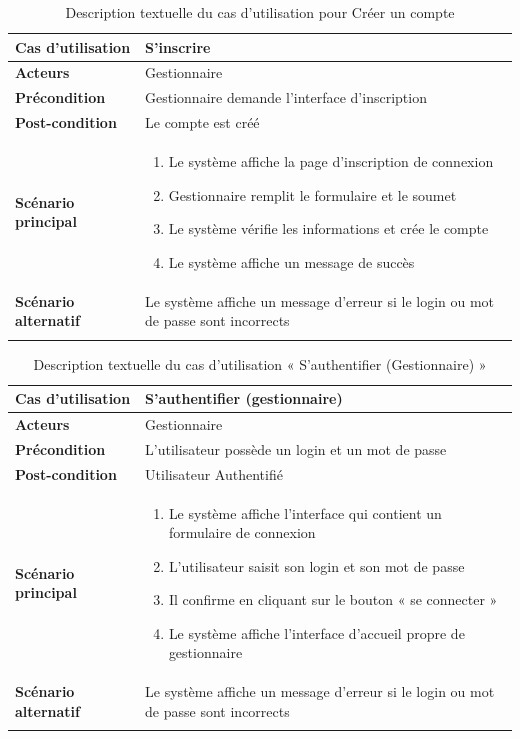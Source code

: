 \begin{longtable}{|>{\bfseries}p{4cm}|p{10cm}|}
\hline
Cas d'utilisation & S'inscrire \\
\hline
Acteurs & Gestionnaire \\
\hline
Précondition & Gestionnaire demande l'interface d'inscription \\
\hline
Post-condition & Le compte est créé \\
\hline
Scénario principal & 
\begin{enumerate}
  \item Le système affiche la page d'inscription de connexion
  \item Gestionnaire remplit le formulaire et le soumet
  \item Le système vérifie les informations et crée le compte
  \item Le système affiche un message de succès
\end{enumerate} \\
\hline
Scénario alternatif & Le système affiche un message d'erreur si le login ou mot de passe sont incorrects \\
\hline
\caption{Description textuelle du cas d'utilisation pour Créer un compte}
\end{longtable}

\begin{longtable}{|>{\bfseries}p{4cm}|p{10cm}|}
\hline
Cas d'utilisation & S'authentifier (gestionnaire) \\
\hline
Acteurs & Gestionnaire \\
\hline
Précondition & L'utilisateur possède un login et un mot de passe \\
\hline
Post-condition & Utilisateur Authentifié \\
\hline
Scénario principal & 
\begin{enumerate}
  \item Le système affiche l'interface qui contient un formulaire de connexion
  \item L'utilisateur saisit son login et son mot de passe
  \item Il confirme en cliquant sur le bouton « se connecter »
  \item Le système affiche l'interface d'accueil propre de gestionnaire
\end{enumerate} \\
\hline
Scénario alternatif & Le système affiche un message d'erreur si le login ou mot de passe sont incorrects \\
\hline
\caption{Description textuelle du cas d'utilisation « S'authentifier (Gestionnaire) »}
\end{longtable}

